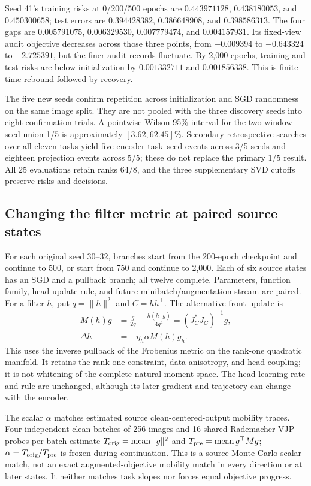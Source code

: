 Seed 41's training risks at 0/200/500 epochs are $0.443971128$, $0.438180053$, and $0.450300658$; test errors are $0.394428382$, $0.386648908$, and $0.398586313$. The four gaps are $0.005791075$, $0.006329530$, $0.007779474$, and $0.004157931$. Its fixed-view audit objective decreases across those three points, from $-0.009394$ to $-0.643324$ to $-2.725391$, but the finer audit records fluctuate. By 2,000 epochs, training and test risks are below initialization by $0.001332711$ and $0.001856338$. This is finite-time rebound followed by recovery.

The five new seeds confirm repetition across initialization and SGD randomness on the same image split. They are not pooled with the three discovery seeds into eight confirmation trials. A pointwise Wilson 95\% interval for the two-window seed union 1/5 is approximately $[3.62,62.45]\%$. Secondary retrospective searches over all eleven tasks yield five encoder task--seed events across 3/5 seeds and eighteen projection events across 5/5; these do not replace the primary 1/5 result. All 25 evaluations retain ranks $64/8$, and the three supplementary SVD cutoffs preserve risks and decisions.

\subsection{Changing the filter metric at paired source states}
For each original seed 30--32, branches start from the 200-epoch checkpoint and continue to 500, or start from 750 and continue to 2,000. Each of six source states has an SGD and a pullback branch; all twelve complete. Parameters, function family, head update rule, and future minibatch/augmentation stream are paired. For a filter $h$, put $q=\|h\|^2$ and $C=hh^\top$. The alternative front update is
\begin{align}
 M(h)g&=\frac{g}{2q}-\frac{h(h^\top g)}{4q^2}
          =(J_C^*J_C)^{-1}g,\\
 \Delta h&=-\eta_h\alpha M(h)g_h.
\end{align}
This uses the inverse pullback of the Frobenius metric on the rank-one quadratic manifold. It retains the rank-one constraint, data anisotropy, and head coupling; it is not whitening of the complete natural-moment space. The head learning rate and rule are unchanged, although its later gradient and trajectory can change with the encoder.

The scalar $\alpha$ matches estimated source clean-centered-output mobility traces. Four independent clean batches of 256 images and 16 shared Rademacher VJP probes per batch estimate $T_{\rm orig}=\operatorname{mean}\|g\|^2$ and $T_{\rm pre}=\operatorname{mean}g^\top Mg$; $\alpha=T_{\rm orig}/T_{\rm pre}$ is frozen during continuation. This is a source Monte Carlo scalar match, not an exact augmented-objective mobility match in every direction or at later states. It neither matches task slopes nor forces equal objective progress.

